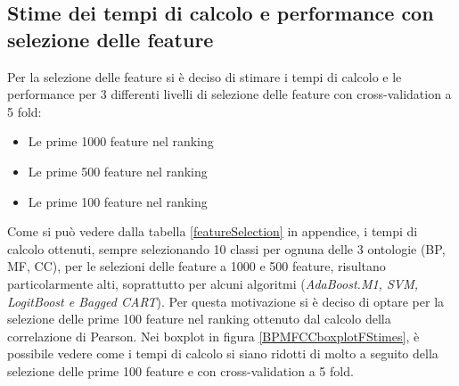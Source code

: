 \documentclass[12pt]{report}
\begin{document}
\subsection{Stime dei tempi di calcolo e performance con selezione delle feature}
Per la selezione delle feature si è deciso di stimare i tempi di calcolo e le performance per 3 differenti livelli di selezione delle feature con cross-validation a 5 fold:
\begin{itemize}
\item Le prime 1000 feature nel ranking
\item Le prime 500 feature nel ranking
\item Le prime 100 feature nel ranking 
\end{itemize}

Come si può vedere dalla tabella \ref{featureSelection} in appendice, i tempi di calcolo ottenuti, sempre selezionando 10 classi per ognuna delle 3 ontologie (BP, MF, CC), per le selezioni delle feature a 1000 e 500 feature, risultano particolarmente alti, soprattutto per alcuni algoritmi (\emph{AdaBoost.M1, SVM, LogitBoost e Bagged CART}).
\newline
\newline
Per questa motivazione si è deciso di optare per la selezione delle prime 100 feature nel ranking ottenuto dal calcolo della correlazione di Pearson. Nei boxplot in figura \ref{BPMFCCboxplotFStimes}, è possibile vedere come i tempi di calcolo si siano ridotti di molto a seguito della selezione delle prime 100 feature e con cross-validation a 5 fold. 
\end{document}
